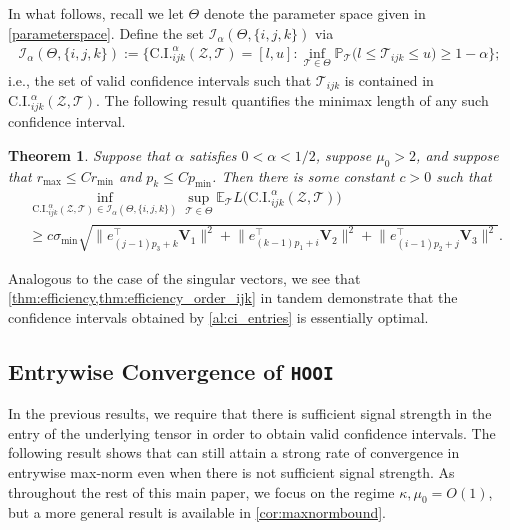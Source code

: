 \documentclass[10pt]{article}
\newcommand{\0}{{\mathbf{0}}}
\newcommand{\1}{{\mathbf{1}}}
\renewcommand{\t}{^{\top}}
\newtheorem{theorem}{Theorem}
\newcommand{\p}{\mathbb{P}}
\begin{document}
In what follows, recall we let $\Theta$ denote the parameter space given in \eqref{parameterspace}.  Define the set $\mathcal{I}_{\alpha}(\Theta,\{i,j,k\})$ via
\begin{align*}
     \mathcal{I}_{\alpha}(\Theta,\{i,j,k\}) := \bigg\{ \mathrm{C.I.}_{ijk}^{\alpha}(\mathcal{Z},\mathcal{T}) = [l, u]: \inf_{\mathcal{T} \in \Theta} \p_{\mathcal{T}}\big( l \leq  \mathcal{T}_{ijk} \leq u \big)\geq 1 - \alpha \bigg\};
 \end{align*}
 i.e., the set of valid confidence intervals such that $\mathcal{T}_{ijk}$ is contained in $\mathrm{C.I.}_{ijk}^{\alpha}(\mathcal{Z},\mathcal{T})$.  The following result quantifies the minimax length of any such confidence interval.

\begin{theorem}\label{thm:efficiency_order_ijk}
 Suppose that $\alpha$ satisfies $0 < \alpha < 1/2$, suppose $\mu_0 > 2$, and suppose that $r_{\max} \leq C r_{\min}$ and $p_k \leq C p_{\min}$. Then there is some constant $c > 0$ such that
 \begin{align*}
     &\inf_{\mathrm{C.I.}^{\alpha}_{ijk}(\mathcal{Z},\mathcal{T}) \in \mathcal{I}_{\alpha}(\Theta,\{i,j,k\})} \sup_{\mathcal{T} \in \Theta} \mathbb{E}_{\mathcal{T}} L\big(\mathrm{C.I.}^{\alpha}_{ijk}(\mathcal{Z},\mathcal{T}) \big) \\
     &\geq c \sigma_{\min} \sqrt{ \big\| e_{(j-1)p_3 + k}\t \mathbf{V}_1 \big\|^2 + \big\| e_{(k-1)p_1 + i}\t \mathbf{V}_2 \big\|^2 + \big\| e_{(i-1)p_2 + j}\t \mathbf{V}_3 \big\|^2 }.
 \end{align*}
 \end{theorem}

Analogous to the case of the singular vectors, we see that \cref{thm:efficiency,thm:efficiency_order_ijk} in tandem demonstrate that the confidence intervals obtained by \cref{al:ci_entries} is essentially optimal.  

\subsection{Entrywise Convergence of \texttt{HOOI}}
In the previous results, we require that there is sufficient signal strength in the entry of the underlying tensor in order to obtain valid confidence intervals. The following result shows that can still attain a strong rate of convergence in entrywise max-norm even when there is not sufficient signal strength.  As throughout the rest of this main paper, we focus on the regime $\kappa,\mu_0 = O(1)$, but a more general result is available in \cref{cor:maxnormbound}. 
\end{document}
